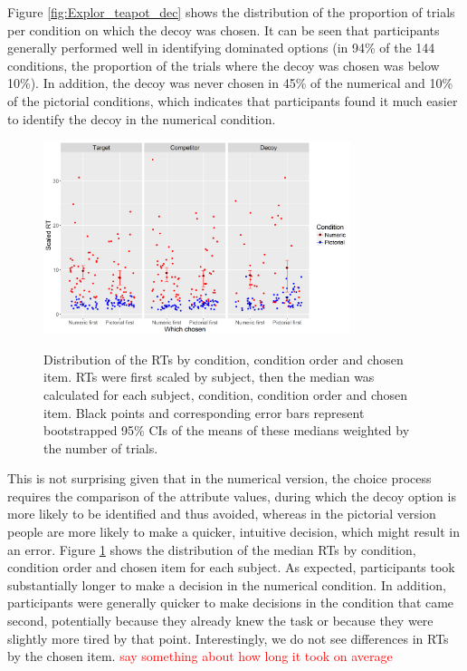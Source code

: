 \documentclass[11pt,a4paper]{article}
\begin{document}
Figure \ref{fig:Explor_teapot_dec} shows the distribution of the proportion of trials per condition on which the decoy was chosen. It can be seen that participants generally performed well in identifying dominated options (in 94\% of the 144 conditions, the proportion of the trials where the decoy was chosen was below 10\%). In addition, the decoy was never chosen in 45\% of the numerical and 10\% of the pictorial conditions, which indicates that participants found it much easier to identify the decoy in the numerical condition.


 \begin{figure}
\centering
\caption{Distribution of the RTs by condition, condition order and chosen item. RTs were first scaled by subject, then the median was calculated for each subject, condition, condition order and chosen item. Black points and corresponding error bars represent bootstrapped 95\% CIs of the means of these medians weighted by the number of trials.}
\includegraphics[width=0.8\textwidth]{Teapot_rts.png}
\label{fig:Teapot_rts}
\end{figure} 

 This is not surprising given that in the numerical version, the choice process requires the comparison of the attribute values, during which the decoy option is more likely to be identified and thus avoided, whereas in the pictorial version people are more likely to make a quicker, intuitive decision, which might result in an error. Figure \ref{fig:Teapot_rts} shows the distribution of the median RTs by condition, condition order and chosen item for each subject. As expected, participants took substantially longer to make a decision in the numerical condition. In addition, participants were generally quicker to make decisions in the condition that came second, potentially because they already knew the task or because they were slightly more tired by that point. Interestingly, we do not see differences in RTs by the chosen item. \textcolor{red} {say something about how long it took on average}
\end{document}
